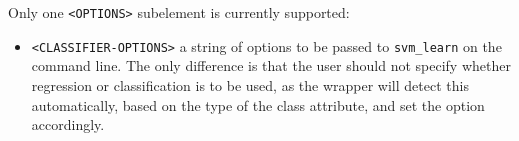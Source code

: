 Only one \verb|<OPTIONS>| subelement is currently supported:
\begin{itemize}
\item \verb|<CLASSIFIER-OPTIONS>| a string of options to be passed to
\texttt{svm\_learn} on the command line. The only difference is that the user
should not specify whether regression or classification is to be used,
as the wrapper will detect this automatically, based on the type of
the class attribute, and set the option accordingly.
\end{itemize}


